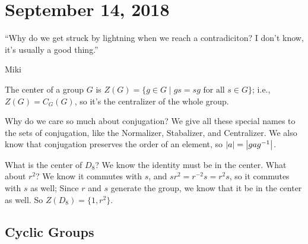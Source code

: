 \section{September 14, 2018}

\epigraph{``Why do we get struck by lightning when we reach a contradiciton? I don't know, it's usually a good thing.'' \lightning}{Miki}

\begin{definition}[Center]
The center of a group $G$ is $Z(G) = \{g \in G \mid gs = sg \text{ for all $s \in G$}\}$; i.e., $Z(G) = C_G(G)$, so it's the centralizer of the whole group.
\end{definition}

Why do we care so much about conjugation? We give all these special names to the sets of conjugation, like the Normalizer, Stabalizer, and Centralizer. We also know that conjugation preserves the order of an element, so $\abs{a} = \abs{gag^{-1}}$.

\begin{problem}
What is the center of $D_8$? We know the identity must be in the center. What about $r^2$? We know it commutes with $s$, and $sr^2 = r^{-2}s = r^2s$, so it commutes with $s$ as well; Since $r$ and $s$ generate the group, we know that it be in the center as well. So $Z(D_8) = \{1, r^2\}$.
\end{problem}

\subsection{Cyclic Groups}


